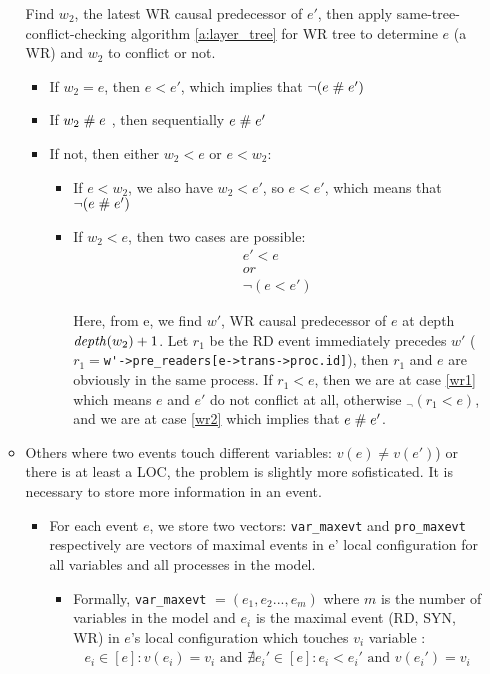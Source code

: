 \documentclass{llncs}
\begin{document}
\begin{enumerate}
\begin{itemize}
		Find $w_2$, the latest WR causal predecessor of $e'$, then apply same-tree-conflict-checking algorithm \cref{a:layer_tree} for WR tree to determine $e$ (a WR) and $w_2$ to conflict or not.
		\begin{itemize}
			\item
			If $w_2 = e$, then $e < e'$, which implies that $\lnot (e \mathrel{\#} e')$
			\item
			If $w_2 \mathrel{\#} e$ , then sequentially $e \mathrel{\#} e'$
			\item
			If not, then either $ w_2< e$ or $e < w_2$:
			\begin{itemize}
				\item
				If $ e < w_2 $, we also have $w_2 < e'$, so $e < e'$, which means that $\lnot (e \mathrel{\#} e')$
				\item
				If $w_2 < e$, then two cases are possible:
				\begin{align}
					e' < e \label{wr1} \\
					or \nonumber \\
					\lnot (e < e') \label{wr2}
				\end{align}
				 
				Here, from e, we find $w'$, WR causal predecessor of $e$ at depth $\mathop{\mathit{depth}} (w_2) + 1$.
				Let $r_1$ be the RD event immediately precedes $w'$ ($r_1 = $\verb!w'->pre_readers[e->trans->proc.id]!), then $r_1$ and $e$ are obviously in the same process. 
				If $r_1 < e$, then we are at case \eqref{wr1} which means $e$ and $e'$ do not conflict at all, otherwise $_\lnot (r_1 < e) $, and we are at case \eqref{wr2} which implies that $e \mathrel{\#} e'$.
			\end{itemize}
		\end{itemize}
		
		\item Others where two events touch different variables: $v(e) \neq v(e')$) or there is at least a LOC, the problem is slightly more sofisticated. It is necessary to store more information in an event.	
		\begin{itemize}
			\item 
			For each event $e$, we store two vectors: \verb!var_maxevt! and \verb!pro_maxevt! respectively are vectors of maximal events in e' local configuration for all variables and all processes in the model.
			\begin{itemize}
				\item
				Formally, \verb!var_maxevt! $ = (e_1, e_2...,e_m)$ where $m$ is the number of variables in 
				the model and $e_i$ is the maximal event (RD, SYN, WR) in $e$'s local configuration which 
				touches $v_i$ variable :
				\begin{align}
				e_i \in  \left[ e \right]: v(e_i) = v_i \text{ and }  \nexists e_i' \in \left[ e \right] :
				e_i < e_i' \text{ and } v(e_i') = v_i \nonumber
				\end{align}
				

\end{itemize}
\end{itemize}
\end{itemize}
\end{enumerate}
\end{document}
